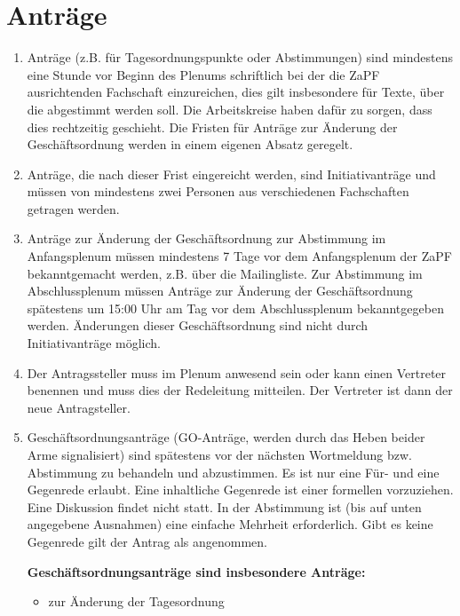 \documentclass[draft,12pt,oneside]{scrreprt}
\begin{document}
\section{Anträge}

\begin{enumerate}
  \item Anträge (z.B. für Tagesordnungspunkte oder Abstimmungen) sind mindestens
        eine Stunde vor Beginn des Plenums schriftlich bei der die ZaPF
        ausrichtenden Fachschaft einzureichen, dies gilt insbesondere für Texte,
        über die abgestimmt werden soll.
        Die Arbeitskreise haben dafür zu sorgen, dass dies rechtzeitig geschieht.
        Die Fristen für Anträge zur Änderung der Geschäftsordnung werden in einem
        eigenen Absatz geregelt.

  \item Anträge, die nach dieser Frist eingereicht werden, sind Initiativanträge
        und müssen von mindestens zwei Personen aus verschiedenen Fachschaften
        getragen werden.

  \item Anträge zur Änderung der Geschäftsordnung zur Abstimmung im Anfangsplenum
        müssen mindestens 7 Tage vor dem
        Anfangsplenum der ZaPF bekanntgemacht werden, z.B. über die Mailingliste.
        Zur Abstimmung im Abschlussplenum müssen Anträge zur Änderung der
        Geschäftsordnung spätestens um 15:00 Uhr am Tag vor dem Abschlussplenum
        bekanntgegeben werden.
        Änderungen dieser Geschäftsordnung sind nicht durch Initiativanträge möglich.

  \item Der Antragssteller muss im Plenum anwesend sein oder kann einen Vertreter
        benennen und muss dies der Redeleitung mitteilen.
        Der Vertreter ist dann der neue Antragsteller.

  \item Geschäftsordnungsanträge (GO-Anträge, werden durch das Heben beider Arme
        signalisiert) sind spätestens vor der nächsten Wortmeldung bzw. Abstimmung
        zu behandeln und abzustimmen.
        Es ist nur eine Für- und eine Gegenrede erlaubt.
        Eine inhaltliche Gegenrede ist einer formellen vorzuziehen.
        Eine Diskussion findet nicht statt.
        In der Abstimmung ist (bis auf unten angegebene Ausnahmen) eine einfache
        Mehrheit erforderlich.
        Gibt es keine Gegenrede gilt der Antrag als angenommen.

    \textbf{Geschäftsordnungsanträge sind insbesondere Anträge:}
    \begin{itemize}
      \item zur Änderung der Tagesordnung


\end{itemize}
\end{enumerate}
\end{document}
